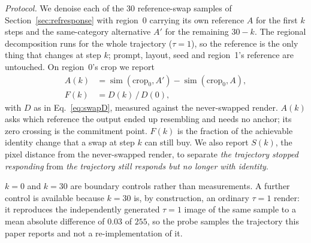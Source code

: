 \documentclass[review,10pt,times]{elsarticle}
\begin{document}
\noindent\textit{Protocol.}
We denoise each of the 30 reference-swap samples of
Section~\ref{sec:refresponse} with region~0 carrying its own reference $A$ for
the first $k$ steps and the same-category alternative $A'$ for the remaining
$30-k$.  The regional decomposition runs for the whole trajectory
($\tau{=}1$), so the reference is the only thing that changes at step $k$;
prompt, layout, seed and region~1's reference are untouched.  On region~0's
crop we report
\begin{align}
  A(k) &= \operatorname{sim}(\mathrm{crop}_0,A')
        - \operatorname{sim}(\mathrm{crop}_0,A), \label{eq:swapA}\\
  F(k) &= D(k)\,/\,D(0), \label{eq:swapF}
\end{align}
with $D$ as in Eq.~\ref{eq:swapD}, measured against the never-swapped render.
$A(k)$ asks which reference the output ended up resembling and needs no
anchor; its zero crossing is the commitment point.  $F(k)$ is the fraction of
the achievable identity change that a swap at step $k$ can still buy.  We also
report $S(k)$, the pixel distance from the never-swapped render, to separate
\emph{the trajectory stopped responding} from \emph{the trajectory still
responds but no longer with identity}.

$k{=}0$ and $k{=}30$ are boundary controls rather than measurements.  A
further control is available because $k{=}30$ is, by construction, an ordinary
$\tau{=}1$ render: it reproduces the independently generated $\tau{=}1$ image
of the same sample to a mean absolute difference of $0.03$ of $255$, so the
probe samples the trajectory this paper reports and not a re-implementation of
it.
\end{document}
